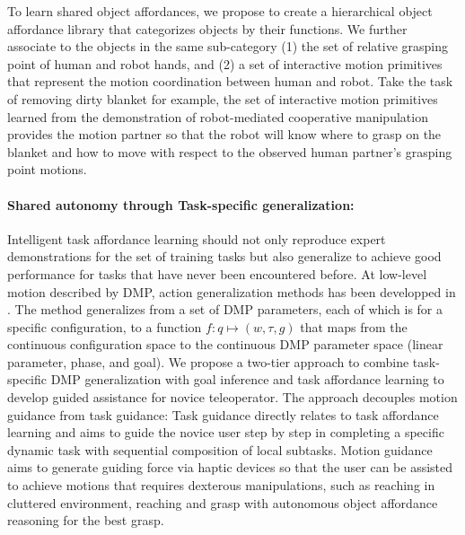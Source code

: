 \documentclass[letterpaper, 11 pt, onecolumn]{article}
\begin{document}
To learn shared object affordances, we propose to create a hierarchical object affordance library that categorizes objects by their functions. We further associate to the objects in the same sub-category (1) the set of relative grasping point of human and robot hands, and (2) a set of interactive motion primitives that represent the motion coordination between human and robot. Take the task of removing dirty blanket for example, the set of interactive motion primitives learned from the demonstration of robot-mediated cooperative manipulation provides the motion partner so that the robot will know where to grasp on the blanket and how to move with respect to the observed human partner's grasping point motions. 

\paragraph*{Shared autonomy through Task-specific generalization:}
Intelligent task affordance learning should not only reproduce expert demonstrations for the set of training tasks but also generalize to achieve good performance for tasks that have never been encountered before. At low-level motion described by DMP, action generalization methods has been developped in \cite{ude2010task}. The method generalizes from a set of DMP parameters, each of which is for  a specific configuration, to a function $f: q \mapsto (w, \tau, g)$   that maps from the continuous configuration space to the continuous DMP parameter space (linear parameter, phase, and goal). We propose a two-tier approach to combine task-specific DMP generalization with goal inference and task affordance learning to develop guided assistance for novice teleoperator. The approach decouples motion guidance from task guidance: Task guidance directly relates to task affordance learning and aims to  guide the novice user step by step in completing a specific dynamic task with sequential composition of local subtasks. Motion guidance aims to generate guiding force via haptic devices so that the user can be assisted to achieve motions that requires dexterous manipulations, such as reaching in cluttered environment, reaching and grasp with autonomous object affordance reasoning for the best grasp.



\end{document}
